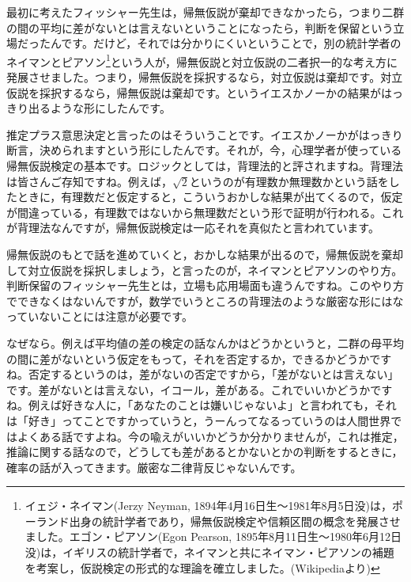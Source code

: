 \documentclass{ltjsbook}
\begin{document}
最初に考えたフィッシャー先生は，帰無仮説が棄却できなかったら，つまり二群の間の平均に差がないとは言えないということになったら，判断を保留という立場だったんです。だけど，それでは分かりにくいということで，別の統計学者のネイマンとピアソン\footnote{イェジ・ネイマン(Jerzy Neyman, 1894年4月16日生～1981年8月5日没)は，ポーランド出身の統計学者であり，帰無仮説検定や信頼区間の概念を発展させました。エゴン・ピアソン(Egon Pearson, 1895年8月11日生～1980年6月12日没)は，イギリスの統計学者で，ネイマンと共にネイマン・ピアソンの補題を考案し，仮説検定の形式的な理論を確立しました。(Wikipediaより)}という人が，帰無仮説と対立仮説の二者択一的な考え方に発展させました。つまり，帰無仮説を採択するなら，対立仮説は棄却です。対立仮説を採択するなら，帰無仮説は棄却です。というイエスかノーかの結果がはっきり出るような形にしたんです。

推定プラス意思決定と言ったのはそういうことです。イエスかノーかがはっきり断言，決められますという形にしたんです。それが，今，心理学者が使っている帰無仮説検定の基本です。ロジックとしては，背理法的と評されますね。背理法は皆さんご存知ですね。例えば，$\sqrt{2}$というのが有理数か無理数かという話をしたときに，有理数だと仮定すると，こういうおかしな結果が出てくるので，仮定が間違っている，有理数ではないから無理数だという形で証明が行われる。これが背理法なんですが，帰無仮説検定は一応それを真似たと言われています。

帰無仮説のもとで話を進めていくと，おかしな結果が出るので，帰無仮説を棄却して対立仮説を採択しましょう，と言ったのが，ネイマンとピアソンのやり方。判断保留のフィッシャー先生とは，立場も応用場面も違うんですね。このやり方でできなくはないんですが，数学でいうところの背理法のような厳密な形にはなっていないことには注意が必要です。

なぜなら。例えば平均値の差の検定の話なんかはどうかというと，二群の母平均の間に差がないという仮定をもって，それを否定するか，できるかどうかですね。否定するというのは，差がないの否定ですから，「差がないとは言えない」です。差がないとは言えない，イコール，差がある。これでいいかどうかですね。例えば好きな人に，「あなたのことは嫌いじゃないよ」と言われても，それは「好き」ってことですかっていうと，うーんってなるっていうのは人間世界ではよくある話ですよね。今の喩えがいいかどうか分かりませんが，これは推定，推論に関する話なので，どうしても差があるとかないとかの判断をするときに，確率の話が入ってきます。厳密な二律背反じゃないんです。
\end{document}

